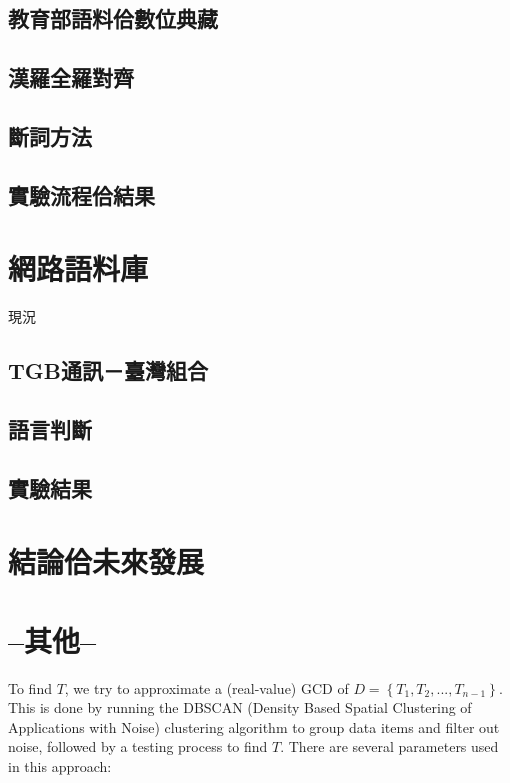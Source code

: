\documentclass[final,oneside,onecolumn,12pt,a4paper]{book}%
\begin{document}
\section{教育部語料佮數位典藏}
\label{節：教育部語料佮數位典藏}

\section{漢羅全羅對齊}
\label{節：漢羅全羅對齊}

\section{斷詞方法}
\label{節：斷詞方法}

\section{實驗流程佮結果}
\label{節：實驗流程佮結果}


\chapter{網路語料庫}
\label{章：網路語料庫}
現況
\section{TGB通訊－臺灣組合}
\label{節：TGB通訊－臺灣組合}

\section{語言判斷}
\label{節：語言判斷}

\section{實驗結果}
\label{節：實驗結果}


\chapter{結論佮未來發展}
\label{章：結論佮未來發展}

\chapter{--其他--}
To find $T$, we try to approximate a (real-value) GCD of $D=\left\{
T_{1},T_{2},...,T_{n-1}\right\}  $. This is done by running the DBSCAN
(Density Based Spatial Clustering of Applications with Noise) clustering
algorithm \cite{Ester1996DBSCAN} to group data items and filter out noise,
followed by a testing process to find $T$. There are several parameters used
in this approach:
\end{document}
